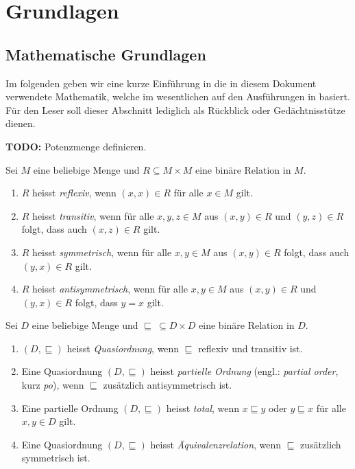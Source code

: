 

\chapter{Grundlagen}
\label{chapter:Grundlagen}



\section{Mathematische Grundlagen}

Im folgenden geben wir eine kurze Einf\"uhrung in die in diesem Dokument verwendete Mathematik,
welche im wesentlichen auf den Ausf\"uhrungen in \cite{Doerfler88} basiert. F\"ur den Leser
soll dieser Abschnitt lediglich als R\"uckblick oder Ged\"achtnisst\"utze dienen.

{\bf TODO:} Potenzmenge definieren.

\begin{definition}
  Sei $M$ eine beliebige Menge und $R \subseteq M \times M$ eine bin\"are Relation in $M$.
  \begin{enumerate}
    \item $R$ heisst {\em reflexiv}, wenn $(x,x)\in{R}$ f\"ur alle $x\in{M}$ gilt.
    \item $R$ heisst {\em transitiv}, wenn f\"ur alle $x,y,z\in{M}$ aus $(x,y)\in{R}$ und
          $(y,z)\in{R}$ folgt, dass auch $(x,z)\in{R}$ gilt.
    \item $R$ heisst {\em symmetrisch}, wenn f\"ur alle $x,y\in{M}$ aus $(x,y)\in{R}$ folgt,
          dass auch $(y,x)\in{R}$ gilt.
    \item $R$ heisst {\em antisymmetrisch}, wenn f\"ur alle $x,y\in{M}$ aus $(x,y)\in{R}$
          und $(y,x)\in{R}$ folgt, dass $y = x$ gilt.
  \end{enumerate}
\end{definition}

\begin{definition}[Ordnungsrelationen]
  Sei $D$ eine beliebige Menge und $\sqsubseteq\ \subseteq D \times D$ eine bin\"are Relation in $D$.
  \begin{enumerate}
    \item $(D,\sqsubseteq)$ heisst {\em Quasiordnung}, wenn $\sqsubseteq$ reflexiv und transitiv ist.
    \item Eine Quasiordnung $(D,\sqsubseteq)$ heisst {\em partielle Ordnung} (engl.: {\em partial order}, kurz
          {\em po}), wenn $\sqsubseteq$ zus\"atzlich antisymmetrisch ist.
    \item Eine partielle Ordnung $(D,\sqsubseteq)$ heisst {\em total}, wenn $x \sqsubseteq y$ oder
          $y \sqsubseteq x$ f\"ur alle $x,y\in{D}$ gilt.
    \item Eine Quasiordnung $(D,\sqsubseteq)$ heisst {\em \"Aquivalenzrelation}, wenn $\sqsubseteq$ zus\"atzlich
          symmetrisch ist.
  \end{enumerate}
\end{definition}

